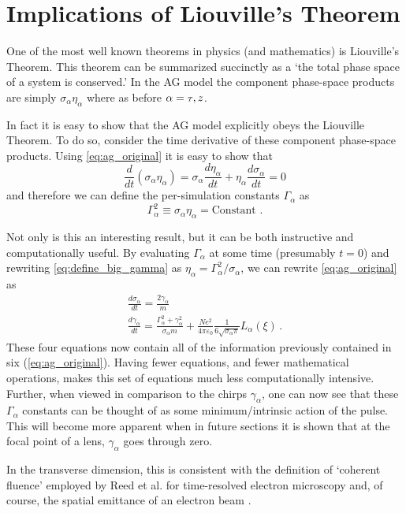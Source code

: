 
\section{Implications of Liouville's Theorem} \label{sec:liouville}

One of the most well known theorems in physics (and mathematics) is Liouville's Theorem.
This theorem can be summarized succinctly as a `the total phase space of a system is conserved.'
In the AG model the component phase-space products are simply $\sigma_{\alpha} \eta_{\alpha}$ where as before $ \alpha = {\scriptscriptstyle T}, z$.

In fact it is easy to show that the AG model explicitly obeys the Liouville Theorem.
To do so, consider the time derivative of these component phase-space products.
Using \ref{eq:ag_original} it is easy to show that
\begin{equation}
  \frac{d}{dt} (\sigma_{\alpha} \eta_{\alpha}) = \sigma_{\alpha} \frac{d \eta_{\alpha}}{dt} + \eta_{\alpha} \frac{d \sigma_{\alpha}}{dt} = 0
\end{equation}
and therefore we can define the per-simulation constants $\Gamma_{\alpha}$ as
\begin{equation} \label{eq:define_big_gamma}
  \Gamma_{\alpha}^2 \equiv \sigma_{\alpha} \eta_{\alpha} = \text{Constant .}
\end{equation}

Not only is this an interesting result, but it can be both instructive and computationally useful.
By evaluating $\Gamma_{\alpha}$ at some time (presumably $t=0$) and rewriting \ref{eq:define_big_gamma} as $\eta_{\alpha} = \Gamma_{\alpha}^2 / \sigma_{\alpha}$, we can rewrite \ref{eq:ag_original} as 
\begin{subequations} \label{eq:ag_big_gamma}
\begin{gather}
  \frac{d\sigma_{\alpha}}{dt} = \frac{2\gamma_{\alpha}}{m} \\
  \frac{d\gamma_{\alpha}}{dt} = \frac{ \Gamma_{\alpha}^2 + \gamma_{\alpha}^2 }{\sigma_{\alpha} m}
    + \frac{N e^2}{4\pi\varepsilon_0} \frac{1}{6 \sqrt{\sigma_{\alpha}\pi}} L_{\alpha}(\xi) \, \text{.} \label{eq:ag_big_gamma_gamma}
\end{gather}
\end{subequations}
These four equations now contain all of the information previously contained in six (\ref{eq:ag_original}).
Having fewer equations, and fewer mathematical operations, makes this set of equations much less computationally intensive.
Further, when viewed in comparison to the chirps $\gamma_{\alpha}$, one can now see that these $\Gamma_{\alpha}$ constants can be thought of as some minimum/intrinsic action of the pulse.
This will become more apparent when in future sections
it is shown that at the focal point of a lens, $\gamma_{\alpha}$ goes through zero.

In the transverse dimension, this is consistent with the definition of `coherent fluence' employed by Reed et al.\cite{reed_evolution_2009} for time-resolved electron microscopy and, of course, the spatial emittance of an electron beam \cite{jensen_theoretical_2006,siwick_ultrafast_2002}.
